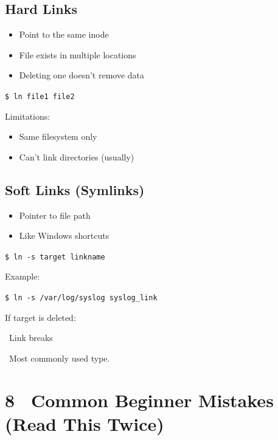 \documentclass[12pt]{article}
\newcommand{\warningicon}{\faExclamationTriangle}
\newcommand{\handicon}{\faHandPointRight}
\begin{document}
\subsection*{Hard Links}

\begin{itemize}
    \item Point to the same inode
    \item File exists in multiple locations
    \item Deleting one doesn't remove data
\end{itemize}

\begin{highlightbox}
\texttt{\$ ln file1 file2}
\end{highlightbox}

Limitations:

\begin{itemize}
    \item Same filesystem only
    \item Can't link directories (usually)
\end{itemize}

\subsection*{Soft Links (Symlinks)}

\begin{itemize}
    \item Pointer to file path
    \item Like Windows shortcuts
\end{itemize}

\begin{highlightbox}
\texttt{\$ ln -s target linkname}
\end{highlightbox}

Example:

\begin{highlightbox}
\texttt{\$ ln -s /var/log/syslog syslog\_link}
\end{highlightbox}

If target is deleted:
\begin{warningbox}
\warningicon\ Link breaks
\end{warningbox}

\begin{infobox}
\handicon\ Most commonly used type.
\end{infobox}

\section*{8 \warningicon\ Common Beginner Mistakes (Read This Twice)}
\end{document}
